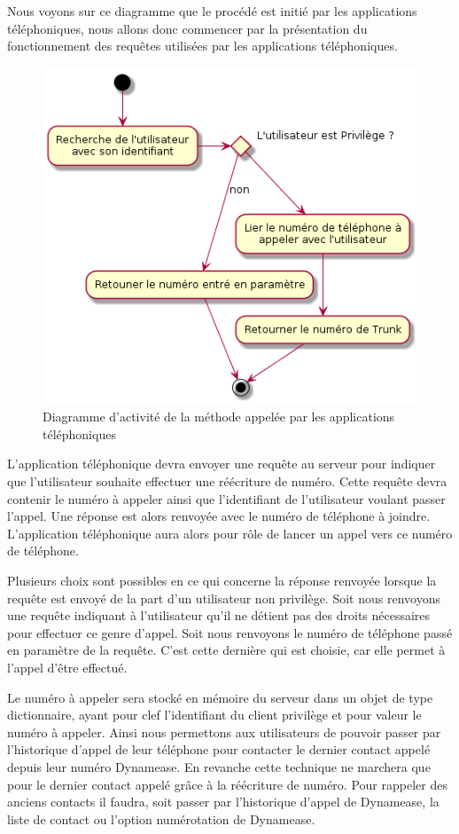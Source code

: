 Nous voyons sur ce diagramme que le procédé est initié par les applications téléphoniques, nous allons donc commencer par la présentation du fonctionnement des requêtes utilisées par les applications téléphoniques.
\newpage
\begin{figure}[!h]
	\centering
	\includegraphics[scale=0.7]{img/activity_rewrite_app.png}
	\caption{\label{activity_rewrite_app} Diagramme d'activité de la méthode appelée par les applications téléphoniques}
\end{figure}



L'application téléphonique devra envoyer une requête au serveur pour indiquer que l'utilisateur souhaite effectuer une réécriture de numéro. Cette requête devra contenir le numéro à appeler ainsi que l'identifiant de l'utilisateur voulant passer l'appel. Une réponse est alors renvoyée avec le numéro de téléphone à joindre. L'application téléphonique aura alors pour rôle de lancer un appel vers ce numéro de téléphone.

Plusieurs choix sont possibles en ce qui concerne la réponse renvoyée lorsque la requête est envoyé de la part d'un utilisateur non privilège. Soit nous renvoyons une requête indiquant à l'utilisateur qu'il ne détient pas des droits nécessaires pour effectuer ce genre d'appel. Soit nous renvoyons le numéro de téléphone passé en paramètre de la requête. C'est cette dernière qui est choisie, car elle permet à l'appel d'être effectué.

Le numéro à appeler sera stocké en mémoire du serveur dans un objet de type dictionnaire, ayant pour clef l'identifiant du client privilège et pour valeur le numéro à appeler. Ainsi nous permettons aux utilisateurs de pouvoir passer par l'historique d'appel de leur téléphone pour contacter le dernier contact appelé depuis leur numéro Dynamease. En revanche cette technique ne marchera que pour le dernier contact appelé grâce à la réécriture de numéro. Pour rappeler des anciens contacts il faudra, soit passer par l'historique d'appel de Dynamease, la liste de contact ou l'option numérotation de Dynamease.\\

